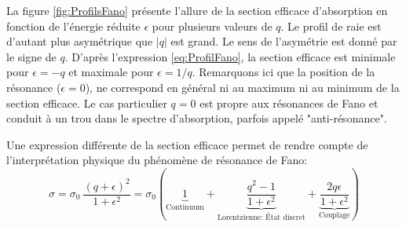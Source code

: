 La figure \ref{fig:ProfilsFano} présente l'allure de la section efficace d'absorption en fonction de l'énergie réduite $\epsilon$ pour plusieurs valeurs de $q$. Le profil de raie est d'autant plus asymétrique que $|q|$ est grand. Le sens de l'asymétrie est donné par le signe de $q$. D'après l'expression \ref{eq:ProfilFano}, la section efficace est minimale pour $\epsilon = - q$ et maximale pour $\epsilon = 1/q$. Remarquons ici que la position de la résonance ($\epsilon = 0$), ne correspond en général ni au maximum ni au minimum de la section efficace. Le cas particulier $q = 0$ est propre aux résonances de Fano et conduit à un trou dans le spectre d'absorption, parfois appelé "anti-résonance".

Une expression différente de la section efficace permet de rendre compte de l'interprétation physique du phénomène de résonance de Fano:
\begin{equation}
\sigma = \sigma_0 \: \frac{\left(q + \epsilon \right) ^2}{1+\epsilon^2} = \sigma_0 \left( \underbrace{1}_\textrm{Continuum} + \underbrace{\frac{q^2 - 1}{1 + \epsilon^2}}_\textrm{Lorentzienne: \'Etat discret} + \underbrace{\frac{2 q \epsilon}{1 + \epsilon^2}}_\textrm{Couplage} \right)
\label{eq:SectionEfficaceFano3termes}
\end{equation}

